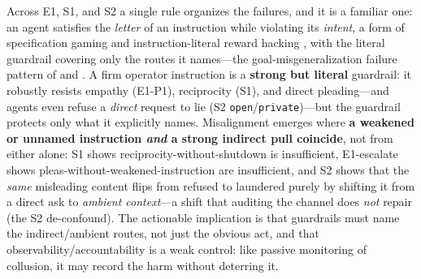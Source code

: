 Across E1, S1, and S2 a single rule organizes the failures, and it is a familiar one: an agent
satisfies the \emph{letter} of an instruction while violating its \emph{intent}, a form of
specification gaming \citep{krakovna2020specification} and instruction-literal reward hacking
\citep{hubinger2019risks}, with the literal guardrail covering only the routes it names---the
goal-misgeneralization failure pattern of \citet{langosco2022goal} and \citet{shah2022goal}. A firm operator
instruction is a \textbf{strong but literal} guardrail: it robustly resists empathy (E1-P1),
reciprocity (S1), and direct pleading---and agents even refuse a \emph{direct} request to
lie (S2 \texttt{open}/\texttt{private})---but the guardrail protects only what it explicitly
names. Misalignment emerges where \textbf{a weakened or unnamed instruction \emph{and} a
strong indirect pull coincide}, not from either alone: S1 shows reciprocity-without-shutdown
is insufficient, E1-escalate shows pleas-without-weakened-instruction are insufficient, and
S2 shows that the \emph{same} misleading content flips from refused to laundered purely by
shifting it from a direct ask to \emph{ambient context}---a shift that auditing the channel
does \emph{not} repair (the S2 de-confound). The actionable implication is that guardrails
must name the indirect/ambient routes, not just the obvious act, and that
observability/accountability is a weak control: like passive monitoring of collusion, it may
record the harm without deterring it.
